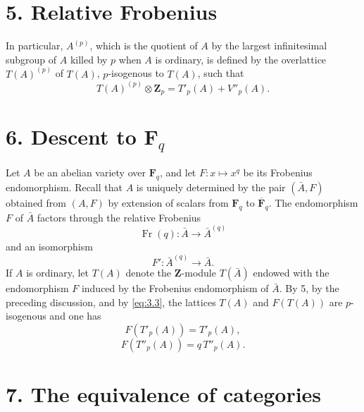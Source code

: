 \documentclass[10pt]{amsart}
\theoremstyle{plain}
\theoremstyle{remark}
\DeclareMathOperator{\Fr}{Fr}
\begin{document}
\section*{5. Relative Frobenius}
In particular, $A^{(p)}$, which is the quotient of $A$ by the largest infinitesimal subgroup of $A$ killed by $p$ when $A$ is ordinary, is defined by the overlattice $T(A)^{(p)}$ of $T(A)$, $p$-isogenous to $T(A)$, such that
\[
T(A)^{(p)}\otimes \mathbf Z_p=T'_p(A)+V''_p(A).
\]

\section*{6. Descent to $\mathbf F_q$}
Let $A$ be an abelian variety over $\mathbf F_q$, and let $F:x\mapsto x^q$ be its Frobenius endomorphism. Recall that $A$ is uniquely determined by the pair $(\bar A,F)$ obtained from $(A,F)$ by extension of scalars from $\mathbf F_q$ to $\overline{\mathbf F}_q$. The endomorphism $F$ of $\bar A$ factors through the relative Frobenius
\[
\Fr(q):\bar A\to \bar A^{(q)}
\]
and an isomorphism
\[
F':\bar A^{(q)}\to \bar A.
\]
If $A$ is ordinary, let $T(A)$ denote the $\mathbf Z$-module $T(\bar A)$ endowed with the endomorphism $F$ induced by the Frobenius endomorphism of $\bar A$. By 5, by the preceding discussion, and by \eqref{eq:3.3}, the lattices $T(A)$ and $F(T(A))$ are $p$-isogenous and one has
\begin{equation}\label{eq:6.1}
F(T'_p(A))=T'_p(A),
\end{equation}
\begin{equation}\label{eq:6.2}
F(T''_p(A))=q\,T''_p(A).
\end{equation}

\section*{7. The equivalence of categories}
\end{document}
